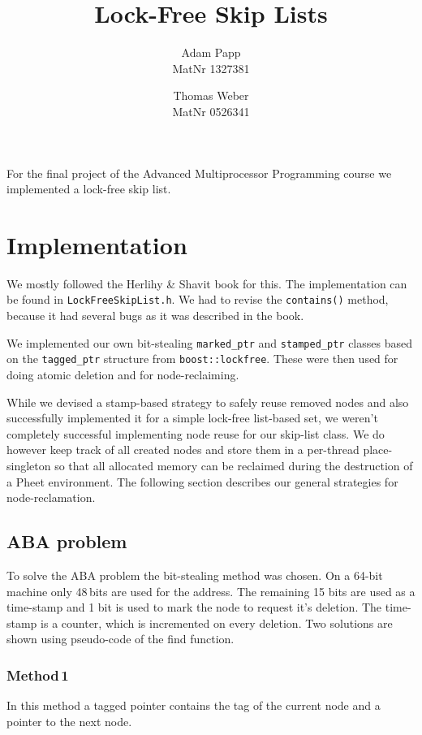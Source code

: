 \documentclass{article}
\title{Lock-Free Skip Lists}
\author{Adam Papp \\ MatNr 1327381 \and Thomas Weber \\ MatNr 0526341}
\begin{document}
\maketitle

For the final project of the Advanced Multiprocessor Programming course we implemented a lock-free skip list.

\section*{Implementation}
We mostly followed the Herlihy \& Shavit book for this.
The implementation can be found in \texttt{LockFreeSkipList.h}.
We had to revise the \texttt{contains()} method, because it had several bugs as it was described in the book.

We implemented our own bit-stealing \texttt{marked\_ptr} and \texttt{stamped\_ptr} classes based on the \texttt{tagged\_ptr} structure from \texttt{boost::lockfree}.
These were then used for doing atomic deletion and for node-reclaiming.

While we devised a stamp-based strategy to safely reuse removed nodes and also successfully implemented it for a simple lock-free list-based set, we weren't completely successful implementing node reuse for our skip-list class.
We do however keep track of all created nodes and store them in a per-thread place-singleton so that all allocated memory can be reclaimed during the destruction of a Pheet environment.
The following section describes our general strategies for node-reclamation.

\subsection*{ABA problem}

To solve the ABA problem the bit-stealing method was chosen.
On a 64-bit machine only 48\,bits are used for the address.
The remaining 15 bits are used as a time-stamp and 1 bit is used to mark the node to request it's deletion.
The time-stamp is a counter, which is incremented on every deletion. Two solutions are shown using pseudo-code of the find function.

\subsubsection*{Method\,1}

In this method a tagged pointer contains the tag of the current node and a pointer to the next node.
\end{document}
